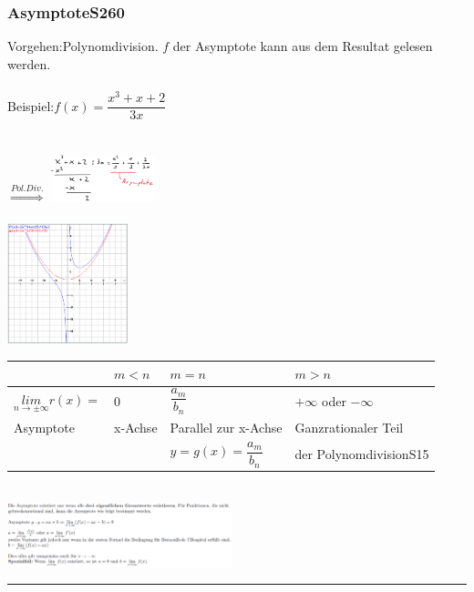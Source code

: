 \subsubsection{Asymptote\color{red}S260}\begin{multicols}{2}
	Vorgehen:\qquad Polynomdivision. $f$ der Asymptote kann aus dem Resultat gelesen werden.\\
	\\
	Beispiel:\qquad $f(x)=\dfrac{x^{3}+x+2}{3x}$ \\
	\\
	\\
	$\overset{Pol.Div.}{\Longrightarrow}$ \qquad \includegraphics[width=3cm]{images/Skizze.png} \qquad\\
	\\
	\centering \includegraphics[width=3.5cm]{images/Graph.PNG}
\end{multicols}
\begin{multicols}{2}
\centering\begin{tabular}{p{1.4cm}|p{8mm}|p{1.3cm}|p{1.5cm}}
	& \tiny $m<n$ & \tiny $m=n$ & \tiny $m>n$\\
	\hline
	\tiny $\underset{n\rightarrow \pm \infty}{lim}r(x)=$ & \tiny 0 & \tiny $\dfrac{a_{m}}{b_{n}}$ & \tiny $+\infty $ oder $-\infty $\\
	\hline
	\tiny Asymptote & \tiny x-Achse & \tiny Parallel zur x-Achse & \tiny Ganzrationaler Teil\\
	&& \tiny $y=g(x)=\dfrac{a_{m}}{b_{n}}$ & \tiny der Polynomdivision\color{red}S15\\	
\end{tabular}\\
\includegraphics[width=6.5cm]{images/Asymptote.PNG}\\
\end{multicols}
\raggedright
\vspace{1cm}
\hrule
